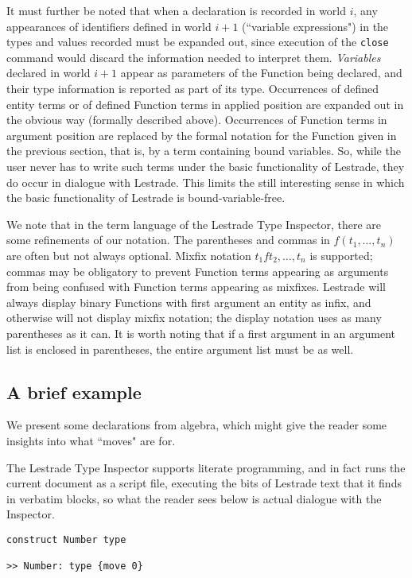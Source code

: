 \documentclass{article}
\begin{document}
It must further be noted that when a declaration is recorded in world $i$, any appearances of identifiers defined in world $i+1$ (``variable expressions") in the types and values recorded must be expanded out, since
execution of the {\tt close} command would discard the information needed to interpret them.  {\em Variables\/} declared in world $i+1$ appear as parameters of the Function being declared, and their type information is reported as part of its type.   Occurrences of defined entity terms or of defined Function terms in applied position are expanded out in the obvious way (formally described above).   Occurrences of Function terms in argument position are replaced by the formal notation for the Function given in the previous section, that is, by a term containing bound variables.  So, while the user never has to write such terms under the basic functionality of Lestrade, they do occur in dialogue with Lestrade.  This limits the still interesting sense in which the basic functionality of Lestrade is bound-variable-free.

We note that in the term language of the Lestrade Type Inspector, there are some refinements of our notation.  The parentheses and commas in $f(t_1,\ldots,t_n)$ are often but not always optional.  Mixfix notation $t_1 f t_2,\ldots,t_n$ is supported; commas may be obligatory to prevent Function terms appearing as arguments from being confused with Function terms appearing as mixfixes.  Lestrade will always display binary Functions with first argument an entity as infix, and otherwise will not display mixfix notation;  the display notation uses as many parentheses as it can.  It is worth noting that if a first argument in an argument list is enclosed in parentheses, the entire argument list must be as well.


\subsection{A brief example}

We present some declarations from algebra, which might give the reader some insights into what ``moves" are for.

The Lestrade Type Inspector supports literate programming, and in fact runs the current document as a script file, executing the bits of Lestrade text that it finds in verbatim blocks, so what the reader sees below is actual dialogue with the Inspector.

\begin{verbatim}
construct Number type

>> Number: type {move 0}
\end{verbatim}
\end{document}
